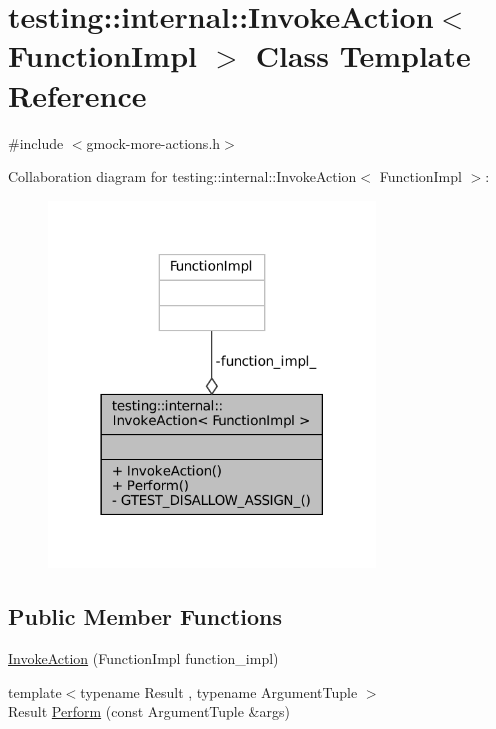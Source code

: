 \hypertarget{classtesting_1_1internal_1_1InvokeAction}{}\section{testing\+:\+:internal\+:\+:Invoke\+Action$<$ Function\+Impl $>$ Class Template Reference}
\label{classtesting_1_1internal_1_1InvokeAction}


{\ttfamily \#include $<$gmock-\/more-\/actions.\+h$>$}



Collaboration diagram for testing\+:\+:internal\+:\+:Invoke\+Action$<$ Function\+Impl $>$\+:
\nopagebreak
\begin{figure}[H]
\begin{center}
\leavevmode
\includegraphics[width=246pt]{classtesting_1_1internal_1_1InvokeAction__coll__graph}
\end{center}
\end{figure}
\subsection*{Public Member Functions}
\begin{DoxyCompactItemize}
\item 
\hyperlink{classtesting_1_1internal_1_1InvokeAction_a786ce772624fc87a31891f465df7ce61}{Invoke\+Action} (Function\+Impl function\+\_\+impl)
\item 
{\footnotesize template$<$typename Result , typename Argument\+Tuple $>$ }\\Result \hyperlink{classtesting_1_1internal_1_1InvokeAction_af357ce691795b3520de1fda4ab8af8b2}{Perform} (const Argument\+Tuple \&args)
\end{DoxyCompactItemize}
